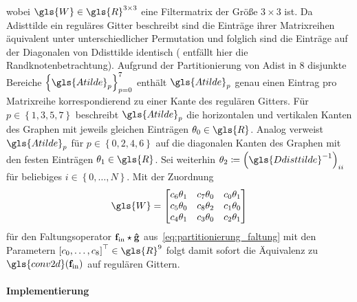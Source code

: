 wobei $\gls{W} \in \gls{R}^{3 \times 3}$ eine Filtermatrix der Größe $3 \times 3$ ist.
Da \gls{Adisttilde} ein reguläres Gitter beschreibt sind die Einträge ihrer Matrixreihen äquivalent unter unterschiedlicher Permutation und folglich sind die Einträge auf der Diagonalen von \gls{Ddisttilde} identisch (\oBdA{} entfällt hier die Randknotenbetrachtung).
Aufgrund der Partitionierung von \gls{Adist} in $8$ disjunkte Bereiche ${\left\{\gls{Atilde}_p\right\}}_{p=0}^7$ enthält $\gls{Atilde}_p$ genau einen Eintrag pro Matrixreihe korrespondierend zu einer Kante des regulären Gitters.
Für $p \in \left\{1, 3, 5, 7\right\}$ beschreibt $\gls{Atilde}_p$ die horizontalen und vertikalen Kanten des Graphen mit jeweils gleichen Einträgen $\theta_0 \in \gls{R}$.
Analog verweist $\gls{Atilde}_p$ für $p \in \left\{0, 2, 4, 6\right\}$ auf die diagonalen Kanten des Graphen mit den festen Einträgen $\theta_1 \in \gls{R}$.
Sei weiterhin \oBdA{} $\theta_2 \coloneqq {\left(\gls{Ddisttilde}^{-1}\right)}_{ii}$ für beliebiges $i \in \left\{0, \ldots, N\right\}$.
Mit der Zuordnung
\begin{equation*}
  \gls{W} = \begin{bmatrix}
    c_6\theta_1 & c_7\theta_0 & c_0\theta_1\\
    c_5\theta_0 & c_8\theta_2 & c_1\theta_0\\
    c_4\theta_1 & c_3\theta_0 & c_2\theta_1
  \end{bmatrix}
\end{equation*}
  für den Faltungsoperator $\mathbf{f}_{\mathrm{in}} \star \mathbf{\hat g}$ aus~\eqref{eq:partitionierung_faltung} mit den Parametern ${\left[c_0, \ldots, c_8\right]}^{\top} \in \gls{R}^9$
folgt damit sofort die Äquivalenz zu $\gls{conv2d}\left(\ve{f}_{\mathrm{in}}\right)$ auf regulären Gittern.

\paragraph{Implementierung}
\label{partitionierung_implementierung}

